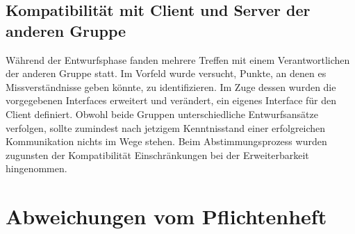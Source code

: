\documentclass[a4paper,10pt]{article}
\begin{document}
\subsection{Kompatibilität mit Client und Server der anderen Gruppe}
Während der Entwurfsphase fanden mehrere Treffen mit einem Verantwortlichen der anderen Gruppe statt. Im Vorfeld wurde versucht, Punkte, an denen es Missverständnisse geben könnte, zu identifizieren. Im Zuge dessen wurden die vorgegebenen Interfaces erweitert und verändert, ein eigenes Interface für den Client definiert. Obwohl beide Gruppen unterschiedliche Entwurfsansätze verfolgen, sollte zumindest nach jetzigem Kenntnisstand einer erfolgreichen Kommunikation nichts im Wege stehen. Beim Abstimmungsprozess wurden zugunsten der Kompatibilität Einschränkungen bei der Erweiterbarkeit hingenommen.
\section{Abweichungen vom Pflichtenheft}
\end{document}
